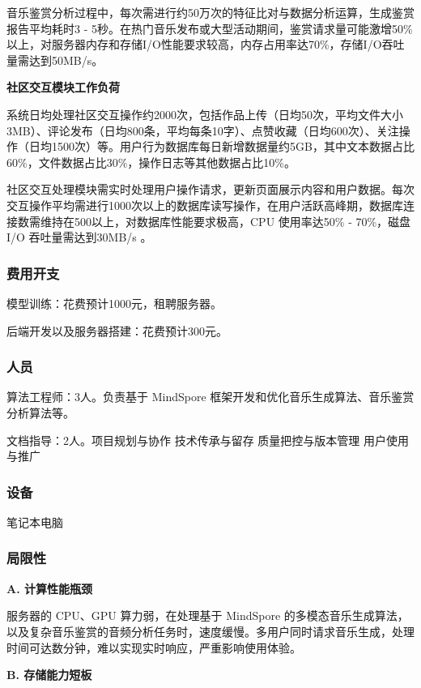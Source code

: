 \documentclass{base}
\numberwithin{figure}{section} %
\begin{document}
音乐鉴赏分析过程中，每次需进行约50万次的特征比对与数据分析运算，生成鉴赏报告平均耗时3 - 5秒。在热门音乐发布或大型活动期间，鉴赏请求量可能激增50\%以上，对服务器内存和存储I/O性能要求较高，内存占用率达70\%，存储I/O吞吐量需达到50MB/s。​

\textbf{社区交互模块工作负荷}

系统日均处理社区交互操作约2000次，包括作品上传（日均50次，平均文件大小3MB）、评论发布（日均800条，平均每条10字）、点赞收藏（日均600次）、关注操作（日均1500次）等。用户行为数据库每日新增数据量约5GB，其中文本数据占比60\%，文件数据占比30\%，操作日志等其他数据占比10\%。​

社区交互处理模块需实时处理用户操作请求，更新页面展示内容和用户数据。每次交互操作平均需进行1000次以上的数据库读写操作，在用户活跃高峰期，数据库连接数需维持在500以上，对数据库性能要求极高，CPU 使用率达50\% - 70\%，磁盘 I/O 吞吐量需达到30MB/s 。

\subsubsection{费用开支}

模型训练：花费预计1000元，租聘服务器。

后端开发以及服务器搭建：花费预计300元。

\subsubsection{人员}

算法工程师：3人。负责基于 MindSpore 框架开发和优化音乐生成算法、音乐鉴赏分析算法等。

文档指导：2人。项目规划与协作 技术传承与留存 质量把控与版本管理 用户使用与推广

\subsubsection{设备}

笔记本电脑

\subsubsection{局限性}

\textbf{A. 计算性能瓶颈​}

服务器的 CPU、GPU 算力弱，在处理基于 MindSpore 的多模态音乐生成算法，以及复杂音乐鉴赏的音频分析任务时，速度缓慢。多用户同时请求音乐生成，处理时间可达数分钟，难以实现实时响应，严重影响使用体验。​

\textbf{B. 存储能力短板​}
\end{document}
